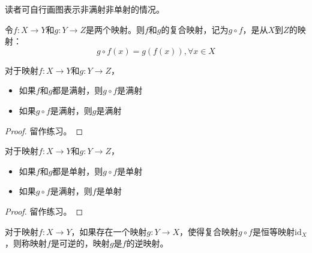 \documentclass[main.tex]{subfiles}
\begin{document}
读者可自行画图表示非满射非单射的情况。

\begin{definition}[复合映射]
令$f:X\rightarrow Y$和$g:Y\rightarrow Z$是两个映射。则$f$和$g$的复合映射，记为$g\circ f$，是从$X$到$Z$的映射：
\[g\circ f\left(x\right)=g\left(f\left(x\right)\right),\forall x\in X\]
\end{definition}

\begin{theorem}
对于映射$f:X\rightarrow Y$和$g: Y\rightarrow Z$，
\begin{itemize}
    \item 如果$f$和$g$都是满射，则$g\circ f$是满射
    \item 如果$g\circ f$是满射，则$g$是满射
\end{itemize}
\end{theorem}
\begin{proof}
留作练习。
\end{proof}

\begin{theorem}
对于映射$f:X\rightarrow Y$和$g: Y\rightarrow Z$，
\begin{itemize}
    \item 如果$f$和$g$都是单射，则$g\circ f$是单射
    \item 如果$g\circ f$是满射，则$f$是单射
\end{itemize}
\end{theorem}
\begin{proof}
留作练习。
\end{proof}

\begin{definition}[逆映射]\label{def:II.1.14}
对于映射$f:X\rightarrow Y$，如果存在一个映射$g:Y\rightarrow X$，使得复合映射$g\circ f$是恒等映射$\mathrm{id}_X$，则称映射$f$是可逆的，映射$g$是$f$的逆映射。
\end{definition}
\end{document}
